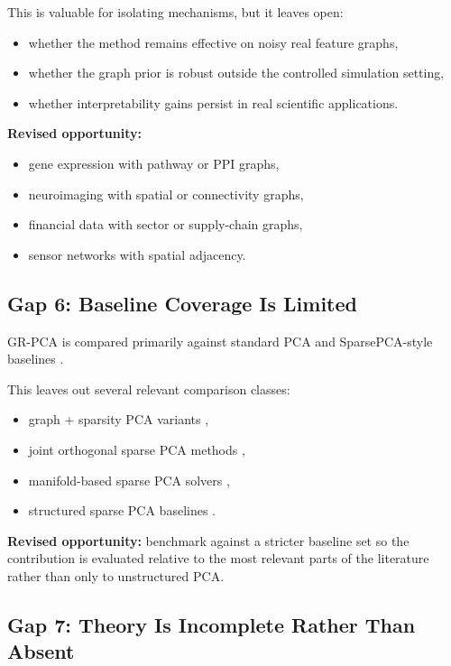 \documentclass[11pt]{article}
\begin{document}
This is valuable for isolating mechanisms, but it leaves open:
\begin{itemize}
    \item whether the method remains effective on noisy real feature graphs,
    \item whether the graph prior is robust outside the controlled simulation setting,
    \item whether interpretability gains persist in real scientific applications.
\end{itemize}

\textbf{Revised opportunity:}
\begin{itemize}
    \item gene expression with pathway or PPI graphs,
    \item neuroimaging with spatial or connectivity graphs,
    \item financial data with sector or supply-chain graphs,
    \item sensor networks with spatial adjacency.
\end{itemize}

\subsection{Gap 6: Baseline Coverage Is Limited}

GR-PCA is compared primarily against standard PCA and SparsePCA-style baselines \cite{briola2026grpca}.

This leaves out several relevant comparison classes:
\begin{itemize}
    \item graph + sparsity PCA variants \cite{feng2019glspca,wu2019gdspca,wang2025rsspca},
    \item joint orthogonal sparse PCA methods \cite{bertsimas2023geospca,cheng2026orthogonalspca},
    \item manifold-based sparse PCA solvers \cite{chen2020amanpg},
    \item structured sparse PCA baselines \cite{jenatton2010sspca}.
\end{itemize}

\textbf{Revised opportunity:} benchmark against a stricter baseline set so the contribution is evaluated relative to the most relevant parts of the literature rather than only to unstructured PCA.

\subsection{Gap 7: Theory Is Incomplete Rather Than Absent}
\end{document}
